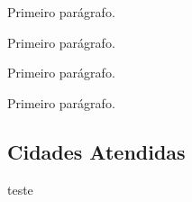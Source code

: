 \documentclass[
12pt,		%
openright,	%
twoside,  %
a4paper,			%
chapter=TITLE,		%
english,			%
french,				%
spanish,			%
brazil				%
]{USPSC-classe/USPSC}
\begin{document}
Primeiro par\'agrafo.

















Primeiro par\'agrafo.

















Primeiro par\'agrafo.

















Primeiro par\'agrafo.

















\subsection[Cidades Atendidas]{Cidades Atendidas}\label{Cidades Atendidas}
teste
\end{document}
